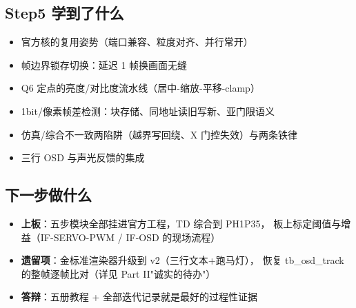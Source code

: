 \documentclass[11pt]{ctexart}
\begin{document}
\subsection*{Step5 学到了什么}
\begin{itemize}
  \item 官方核的复用姿势（端口兼容、粒度对齐、并行常开）
  \item 帧边界锁存切换：延迟 1 帧换画面无缝
  \item Q6 定点的亮度/对比度流水线（居中-缩放-平移-clamp）
  \item 1bit/像素帧差检测：块存储、同地址读旧写新、亚门限语义
  \item 仿真/综合不一致两陷阱（越界写回绕、X 门控失效）与两条铁律
  \item 三行 OSD 与声光反馈的集成
\end{itemize}

\subsection*{下一步做什么}
\begin{itemize}
  \item \textbf{上板}：五步模块全部挂进官方工程，TD 综合到 PH1P35，
    板上标定阈值与增益（IF-SERVO-PWM / IF-OSD 的现场流程）
  \item \textbf{遗留项}：金标准渲染器升级到 v2（三行文本+跑马灯），
    恢复 tb\_osd\_track 的整帧逐帧比对（详见 Part II"诚实的待办"）
  \item \textbf{答辩}：五册教程 + 全部迭代记录就是最好的过程性证据
\end{itemize}
\end{document}
